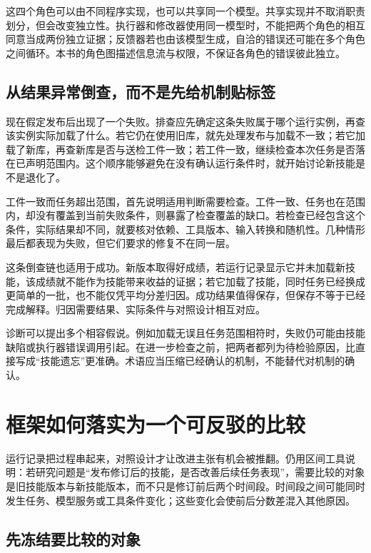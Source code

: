 这四个角色可以由不同程序实现，也可以共享同一个模型。共享实现并不取消职责划分，但会改变独立性。执行器和修改器使用同一模型时，不能把两个角色的相互同意当成两份独立证据；反馈器若也由该模型生成，自洽的错误还可能在多个角色之间循环。本书的角色图描述信息流与权限，不保证各角色的错误彼此独立。

\subsection{从结果异常倒查，而不是先给机制贴标签}

现在假定发布后出现了一个失败。排查应先确定这条失败属于哪个运行实例，再查该实例实际加载了什么。若它仍在使用旧库，就先处理发布与加载不一致；若它加载了新库，再查新库是否与送检工件一致；若工件一致，继续检查本次任务是否落在已声明范围内。这个顺序能够避免在没有确认运行条件时，就开始讨论新技能是不是退化了。

工件一致而任务超出范围，首先说明适用判断需要检查。工件一致、任务也在范围内，却没有覆盖到当前失败条件，则暴露了检查覆盖的缺口。若检查已经包含这个条件，实际结果却不同，就要核对依赖、工具版本、输入转换和随机性。几种情形最后都表现为失败，但它们要求的修复不在同一层。

这条倒查链也适用于成功。新版本取得好成绩，若运行记录显示它并未加载新技能，该成绩就不能作为技能带来收益的证据；若它加载了技能，同时任务已经换成更简单的一批，也不能仅凭平均分差归因。成功结果值得保存，但保存不等于已经完成解释。归因需要结果、实际条件与对照设计相互对应。

诊断可以提出多个相容假说。例如加载无误且任务范围相符时，失败仍可能由技能缺陷或执行器错误调用引起。在进一步检查之前，把两者都列为待检验原因，比直接写成“技能遗忘”更准确。术语应当压缩已经确认的机制，不能替代对机制的确认。

\section{框架如何落实为一个可反驳的比较}
\label{sec:ch02-testable-comparison}

运行记录把过程串起来，对照设计才让改进主张有机会被推翻。仍用区间工具说明：若研究问题是“发布修订后的技能，是否改善后续任务表现”，需要比较的对象是旧技能版本与新技能版本，而不只是修订前后两个时间段。时间段之间可能同时发生任务、模型服务或工具条件变化；这些变化会使前后分数差混入其他原因。

\subsection{先冻结要比较的对象}

